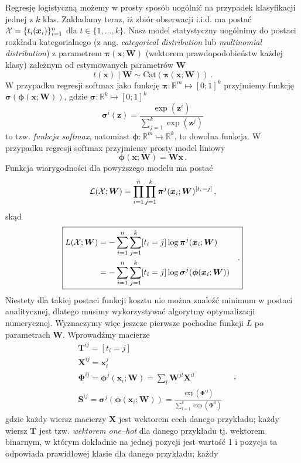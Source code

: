 \documentclass{myclass}
\numberwithin{equation}{subsection}
\begin{document}
Regresję logistyczną możemy w prosty sposób uogólnić na przypadek klasyfikacji jednej z \(k\) klas.
Zakładamy teraz, iż zbiór obserwacji i.i.d. ma postać \(\mathcal{X} = \{t_i(\bm{x}_i)\}_{i=1}^n\) dla \(t
\in \{1,\ldots,k\}\). Nasz model statystyczny uogólnimy do postaci rozkładu kategorialnego (z ang.
\textit{categorical distribution} lub \textit{multinomial distribution}) z parametrem
\(\bm{\pi}(\bm{x}; \bm{W})\) (wektorem prawdopodobieństw każdej klasy) zależnym od estymowanych
parametrów \(\bm{W}\)
\[
t(\bm{x}) \mid \bm{W} \sim \mathrm{Cat}(\bm{\pi}(\bm{x}; \bm{W}))\,.
\]
W przypadku regresji softmax jako funkcję \(\bm{\pi}: \mathbb{R}^m \mapsto [0;1]^k\) przyjmiemy
funkcję \(\bm{\sigma}(\bm{\phi}(\bm{x}; \bm{W}))\), gdzie \(\bm{\sigma}: \mathbb{R}^k \mapsto
[0;1]^k\)
\[
\bm{\sigma}^i(\bm{z}) = \frac{\exp(\bm{z}^i)}{ \sum_{j=1}^k \exp(\bm{z}^j)}
\]
to tzw. \emph{funkcja softmax}, natomiast \(\bm{\phi}: \mathbb{R}^m \mapsto \mathbb{R}^k\), to
dowolna funkcja. W przypadku regresji softmax przyjmiemy prosty model liniowy
\[
\bm{\phi}(\bm{x}; \bm{W}) = \bm{W}\bm{x}\,.
\]
Funkcja wiarygodności dla powyższego modelu ma postać
\[
\mathcal{L}(\mathcal{X}; \bm{W}) = \prod_{i=1}^n \prod_{j=1}^k \bm{\pi}^j(\bm{x}_i; \bm{W})^{[t_i = j]}\,,
\]
skąd
\[
\boxed{
\begin{split}
L(\mathcal{X}; \bm{W}) &= - \sum_{i=1}^n \sum_{j=1}^k [t_i = j] \log \bm{\pi}^j(\bm{x}_i; \bm{W})\\
                    &= - \sum_{i=1}^n \sum_{j=1}^k [t_i = j] \log \bm{\sigma}^j(\bm{\phi}(\bm{x}_i; \bm{W}))
\end{split}\quad.
}
\]
Niestety dla takiej postaci funkcji kosztu nie można znaleźć minimum w postaci analitycznej, dlatego
musimy wykorzystywać algorytmy optymalizacji numerycznej. Wyznaczymy więc jeszcze pierwsze pochodne
funkcji \(L\) po parametrach \(\bm{W}\). Wprowadźmy macierze
\[
\begin{split}
&\bm{T}^{ij} = [t_i = j]\\
&\bm{X}^{ij} = \bm{x}_i^j \\
&\bm{\Phi}^{ij} = \bm{\phi}^j(\bm{x}_i; \bm{W}) = \sum_l \bm{W}^{jl} \bm{X}^{il}\\
&\bm{S}^{ij} = \bm{\sigma}^j(\bm{\phi}(\bm{x}_i; \bm{W})) = \frac{\exp(\bm{\Phi}^{ij})}{\sum_{l=1}^k \exp(\bm{\Phi}^{il})}
\end{split}\quad,
\]
gdzie każdy wiersz macierzy \(\bm{X}\) jest wektorem cech danego przykładu; każdy wiersz \(\bm{T}\)
jest tzw. \emph{wektorem one--hot} dla danego przykładu tj. wektorem binarnym, w którym dokładnie na
jednej pozycji jest wartość 1 i pozycja ta odpowiada prawidłowej klasie dla danego przykładu; każdy
\end{document}
